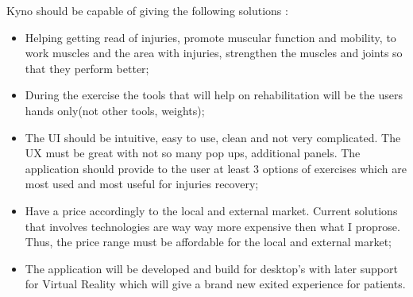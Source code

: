 Kyno should be capable of giving the following solutions :

\begin{itemize}
\item Helping getting read of injuries, promote muscular function and mobility, to work muscles and the area with injuries, strengthen the muscles and joints so that they perform better;
\item During the exercise the tools that will help on rehabilitation will be the users hands only(not other tools, weights);

\item The UI should be intuitive, easy to use, clean and not very complicated. The UX must be great with not so many pop ups, additional panels. The application should provide to the user at least 3 options of exercises which are most used and most useful for injuries recovery;
\item Have a price accordingly to the local and external market. Current solutions that involves technologies are way way more expensive then what I proprose. Thus, the price range must be affordable for the local and external market;
\item The application will be developed and build for desktop's with later support for Virtual Reality which will give a brand new exited experience for patients.
\end{itemize}

